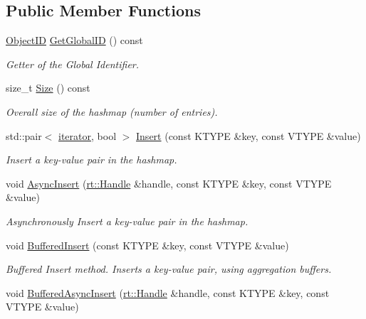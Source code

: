 \subsection*{Public Member Functions}
\begin{DoxyCompactItemize}
\item 
\hyperlink{classshad_1_1Hashmap_a1f10a3b0cce639008b5b9444eb167f8b}{Object\-I\-D} \hyperlink{classshad_1_1Hashmap_a7a7242cd82188b05280e4f8faaeac387}{Get\-Global\-I\-D} () const 
\begin{DoxyCompactList}\small\item\em Getter of the Global Identifier. \end{DoxyCompactList}\item 
size\-\_\-t \hyperlink{classshad_1_1Hashmap_ae05da08d72f0a2097a64603f49cc91ac}{Size} () const 
\begin{DoxyCompactList}\small\item\em Overall size of the hashmap (number of entries). \end{DoxyCompactList}\item 
std\-::pair$<$ \hyperlink{classshad_1_1Hashmap_a2500b369fd011d6a9d5e98ff213c9c66}{iterator}, bool $>$ \hyperlink{classshad_1_1Hashmap_afd44f019edac86a4b397bc36294c47ab}{Insert} (const K\-T\-Y\-P\-E \&key, const V\-T\-Y\-P\-E \&value)
\begin{DoxyCompactList}\small\item\em Insert a key-\/value pair in the hashmap. \end{DoxyCompactList}\item 
void \hyperlink{classshad_1_1Hashmap_a6cfddc1040192ee87e5c41f443e6557d}{Async\-Insert} (\hyperlink{classshad_1_1rt_1_1Handle}{rt\-::\-Handle} \&handle, const K\-T\-Y\-P\-E \&key, const V\-T\-Y\-P\-E \&value)
\begin{DoxyCompactList}\small\item\em Asynchronously Insert a key-\/value pair in the hashmap. \end{DoxyCompactList}\item 
void \hyperlink{classshad_1_1Hashmap_a94e4c630fc430e83776f8a34fcae06c2}{Buffered\-Insert} (const K\-T\-Y\-P\-E \&key, const V\-T\-Y\-P\-E \&value)
\begin{DoxyCompactList}\small\item\em Buffered Insert method. Inserts a key-\/value pair, using aggregation buffers. \end{DoxyCompactList}\item 
void \hyperlink{classshad_1_1Hashmap_a81d82387ec408ec61db465e60401c77a}{Buffered\-Async\-Insert} (\hyperlink{classshad_1_1rt_1_1Handle}{rt\-::\-Handle} \&handle, const K\-T\-Y\-P\-E \&key, const V\-T\-Y\-P\-E \&value)

\end{DoxyCompactItemize}

